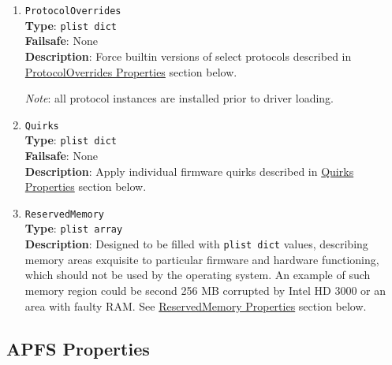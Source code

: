 \documentclass[]{article}
\begin{document}
\begin{enumerate}
\item
  \texttt{ProtocolOverrides}\\
  \textbf{Type}: \texttt{plist\ dict}\\
  \textbf{Failsafe}: None\\
  \textbf{Description}: Force builtin versions of select protocols described
  in \hyperref[uefiprotoprops]{ProtocolOverrides Properties} section below.

  \emph{Note}: all protocol instances are installed prior to driver loading.

\item
  \texttt{Quirks}\\
  \textbf{Type}: \texttt{plist\ dict}\\
  \textbf{Failsafe}: None\\
  \textbf{Description}: Apply individual firmware quirks described in
  \hyperref[uefiquirkprops]{Quirks Properties} section below.

\item
  \texttt{ReservedMemory}\\
  \textbf{Type}: \texttt{plist\ array}\\
  \textbf{Description}: Designed to be filled with \texttt{plist\ dict} values,
  describing memory areas exquisite to particular firmware and hardware functioning,
  which should not be used by the operating system. An example of such memory region
  could be second 256 MB corrupted by Intel HD 3000 or an area with faulty RAM.
  See \hyperref[uefirsvdprops]{ReservedMemory Properties} section below.

\end{enumerate}

\subsection{APFS Properties}\label{uefiapfsprops}
\end{document}
